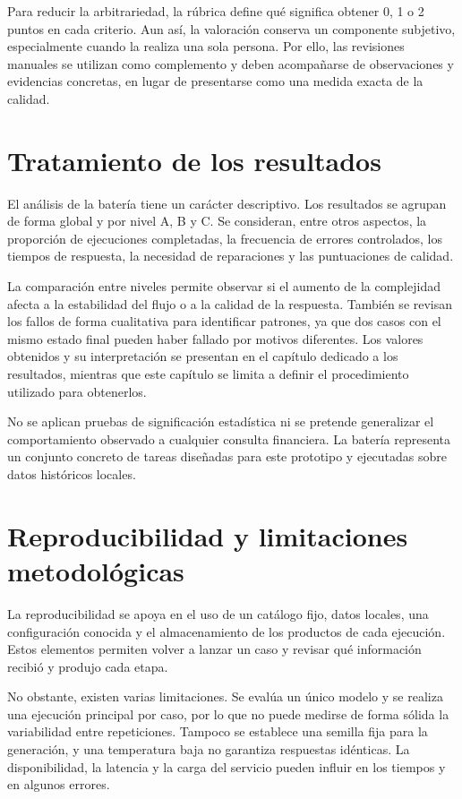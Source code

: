 Para reducir la arbitrariedad, la rúbrica define qué significa obtener 0, 1 o 2 puntos en cada criterio. Aun así, la valoración conserva un componente subjetivo, especialmente cuando la realiza una sola persona. Por ello, las revisiones manuales se utilizan como complemento y deben acompañarse de observaciones y evidencias concretas, en lugar de presentarse como una medida exacta de la calidad.

\section{Tratamiento de los resultados}

El análisis de la batería tiene un carácter descriptivo. Los resultados se agrupan de forma global y por nivel A, B y C. Se consideran, entre otros aspectos, la proporción de ejecuciones completadas, la frecuencia de errores controlados, los tiempos de respuesta, la necesidad de reparaciones y las puntuaciones de calidad.

La comparación entre niveles permite observar si el aumento de la complejidad afecta a la estabilidad del flujo o a la calidad de la respuesta. También se revisan los fallos de forma cualitativa para identificar patrones, ya que dos casos con el mismo estado final pueden haber fallado por motivos diferentes. Los valores obtenidos y su interpretación se presentan en el capítulo dedicado a los resultados, mientras que este capítulo se limita a definir el procedimiento utilizado para obtenerlos.

No se aplican pruebas de significación estadística ni se pretende generalizar el comportamiento observado a cualquier consulta financiera. La batería representa un conjunto concreto de tareas diseñadas para este prototipo y ejecutadas sobre datos históricos locales.

\section{Reproducibilidad y limitaciones metodológicas}

La reproducibilidad se apoya en el uso de un catálogo fijo, datos locales, una configuración conocida y el almacenamiento de los productos de cada ejecución. Estos elementos permiten volver a lanzar un caso y revisar qué información recibió y produjo cada etapa.

No obstante, existen varias limitaciones. Se evalúa un único modelo y se realiza una ejecución principal por caso, por lo que no puede medirse de forma sólida la variabilidad entre repeticiones. Tampoco se establece una semilla fija para la generación, y una temperatura baja no garantiza respuestas idénticas. La disponibilidad, la latencia y la carga del servicio pueden influir en los tiempos y en algunos errores.

